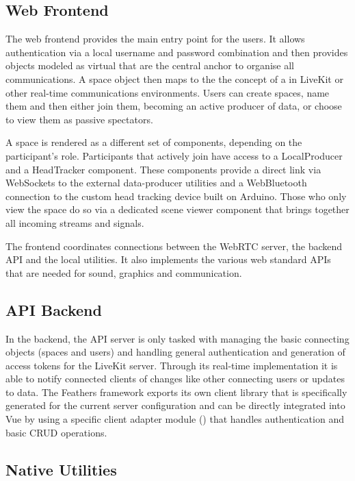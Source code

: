 \subsection{Web Frontend}

The web frontend provides the main entry point for the users. It allows authentication via a local username and password combination and then provides objects modeled as virtual  that are the central anchor to organise all communications. A space object then maps to the the concept of a  in LiveKit or other real-time communications environments. Users can create spaces, name them and then either join them, becoming an active producer of data, or choose to view them as passive spectators.

A space is rendered as a different set of components, depending on the participant's role. Participants that actively join have access to a LocalProducer and a HeadTracker component. These components provide a direct link via WebSockets to the external data-producer utilities and a WebBluetooth connection to the custom head tracking device built on Arduino. Those who only view the space do so via a dedicated scene viewer component that brings together all incoming streams and signals.

The frontend coordinates connections between the WebRTC server, the backend \ac{API} and the local utilities. It also implements the various web standard \ac{API}s that are needed for sound, graphics and communication.

\subsection{API Backend}

In the backend, the \ac{API} server is only tasked with managing the basic connecting objects (spaces and users) and handling general authentication and generation of access tokens for the LiveKit server. Through its real-time implementation it is able to notify connected clients of changes like other connecting users or updates to data. The Feathers framework exports its own client library that is specifically generated for the current server configuration and can be directly integrated into Vue by using a specific client adapter module () that handles authentication and basic \ac{CRUD} operations.

\subsection{Native Utilities}


